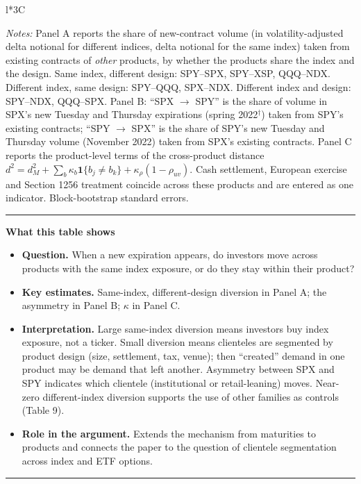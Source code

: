 \documentclass[11pt]{article}
\newenvironment{tableshows}
  {\begin{center}\begin{minipage}{0.95\textwidth}\small
   \hrule\vspace{4pt}
   \textbf{What this table shows}\par
   \begin{itemize}[leftmargin=12pt,topsep=4pt,itemsep=4pt,parsep=0pt]}
  {\end{itemize}\vspace{2pt}\hrule\end{minipage}\end{center}}
\begin{document}
\begin{table}[H]
\begin{threeparttable}
\begin{tabularx}{\textwidth}{l*{3}{C}}
\bottomrule
\end{tabularx}
\begin{tablenotes}
\footnotesize
\item[] \textit{Notes:} Panel A reports the share of new-contract volume (in volatility-adjusted delta notional for different indices, delta notional for the same index) taken from existing contracts of \textit{other} products, by whether the products share the index and the design. Same index, different design: SPY--SPX, SPY--XSP, QQQ--NDX. Different index, same design: SPY--QQQ, SPX--NDX. Different index and design: SPY--NDX, QQQ--SPX. Panel B: ``SPX $\rightarrow$ SPY'' is the share of volume in SPX's new Tuesday and Thursday expirations (spring 2022$^\dagger$) taken from SPY's existing contracts; ``SPY $\rightarrow$ SPX'' is the share of SPY's new Tuesday and Thursday volume (November 2022) taken from SPX's existing contracts. Panel C reports the product-level terms of the cross-product distance $d^2 = d_M^2 + \sum_b \kappa_b \mathbf{1}\{b_j \neq b_k\} + \kappa_\rho (1 - \rho_{uv})$. Cash settlement, European exercise and Section 1256 treatment coincide across these products and are entered as one indicator. Block-bootstrap standard errors.
\end{tablenotes}
\end{threeparttable}
\end{table}

\begin{tableshows}
\item \textbf{Question.} When a new expiration appears, do investors move across products with the same index exposure, or do they stay within their product?
\item \textbf{Key estimates.} Same-index, different-design diversion in Panel A; the asymmetry in Panel B; $\kappa$ in Panel C.
\item \textbf{Interpretation.} Large same-index diversion means investors buy index exposure, not a ticker. Small diversion means clienteles are segmented by product design (size, settlement, tax, venue); then ``created'' demand in one product may be demand that left another. Asymmetry between SPX and SPY indicates which clientele (institutional or retail-leaning) moves. Near-zero different-index diversion supports the use of other families as controls (Table 9).
\item \textbf{Role in the argument.} Extends the mechanism from maturities to products and connects the paper to the question of clientele segmentation across index and ETF options.
\end{tableshows}
\end{document}
